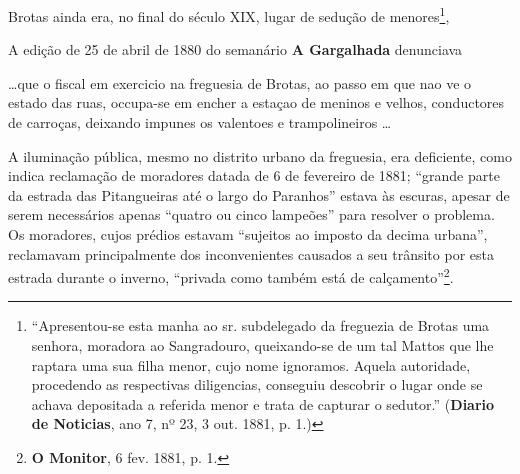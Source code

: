 Brotas ainda era, no final do século XIX, lugar de sedução de menores\footnote{  ``Apresentou-se esta manha ao sr. subdelegado da freguezia de Brotas uma senhora, moradora ao Sangradouro, queixando-se de um tal Mattos que lhe raptara uma sua filha menor, cujo nome ignoramos. Aquela autoridade, procedendo as respectivas diligencias, conseguiu descobrir o lugar onde se achava depositada a referida menor e trata de capturar o sedutor.'' (\textbf{Diario de Noticias}, ano 7, nº 23, 3 out. 1881, p. 1.)}, 

A edição de 25 de abril de 1880 do semanário \textbf{A Gargalhada} denunciava

\begin{citacao}
\dots que o fiscal em exercicio na freguesia de Brotas, ao passo em que nao ve o estado das ruas, occupa-se em encher a estaçao de meninos e velhos, conductores de carroças, deixando impunes os valentoes e trampolineiros \dots
\end{citacao}

A iluminação pública, mesmo no distrito urbano da freguesia, era deficiente, como indica reclamação de moradores datada de 6 de fevereiro de 1881; ``grande parte da estrada das Pitangueiras até o largo do Paranhos'' estava às escuras, apesar de serem necessários apenas ``quatro ou cinco lampeões'' para resolver o problema. Os moradores, cujos prédios estavam ``sujeitos ao imposto da decima urbana'', reclamavam principalmente dos inconvenientes causados a seu trânsito por esta estrada durante o inverno, ``privada como também está de calçamento''\footnote{\textbf{O Monitor}, 6 fev. 1881, p. 1.}.

